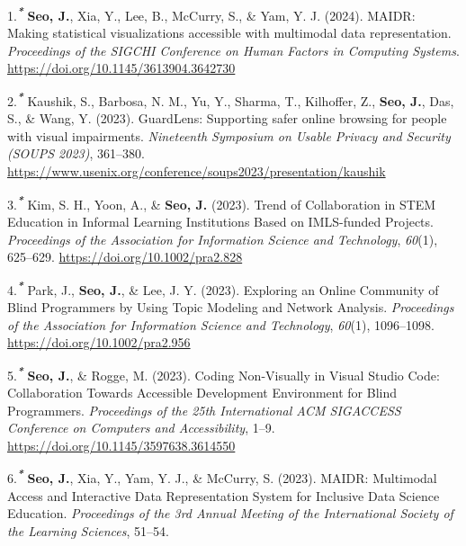 \documentclass[11pt,a4paper,]{awesome-cv}
\newlength{\cslhangindent}
\newenvironment{CSLReferences}[2] %
 {\begin{list}{}{%
  \setlength{\itemindent}{0pt}
  \setlength{\leftmargin}{0pt}
  \setlength{\parsep}{0pt}
  \ifodd #1
   \setlength{\leftmargin}{\cslhangindent}
   \setlength{\itemindent}{-1\cslhangindent}
  \fi
  \setlength{\itemsep}{#2\baselineskip}}}
 {\end{list}}
\begin{document}
\label{refs-1352c89c0d7745c29a221d6dc881aa0d}
\begin{CSLReferences}{1}{0}
1.\textsuperscript{\textbf{\emph{*}}} \textbf{Seo, J.}, Xia, Y., Lee,
B., McCurry, S., \& Yam, Y. J. (2024). MAIDR: Making statistical
visualizations accessible with multimodal data representation.
\emph{Proceedings of the SIGCHI Conference on Human Factors in Computing
Systems}. \url{https://doi.org/10.1145/3613904.3642730}

2.\textsuperscript{\textbf{\emph{*}}} Kaushik, S., Barbosa, N. M., Yu,
Y., Sharma, T., Kilhoffer, Z., \textbf{Seo, J.}, Das, S., \& Wang, Y.
(2023). GuardLens: Supporting safer online browsing for people with
visual impairments. \emph{Nineteenth Symposium on Usable Privacy and
Security (SOUPS 2023)}, 361--380.
\url{https://www.usenix.org/conference/soups2023/presentation/kaushik}

3.\textsuperscript{\textbf{\emph{*}}} Kim, S. H., Yoon, A., \&
\textbf{Seo, J.} (2023). Trend of Collaboration in STEM Education in
Informal Learning Institutions Based on IMLS-funded Projects.
\emph{Proceedings of the Association for Information Science and
Technology}, \emph{60}(1), 625--629.
\url{https://doi.org/10.1002/pra2.828}

4.\textsuperscript{\textbf{\emph{*}}} Park, J., \textbf{Seo, J.}, \&
Lee, J. Y. (2023). Exploring an Online Community of Blind Programmers by
Using Topic Modeling and Network Analysis. \emph{Proceedings of the
Association for Information Science and Technology}, \emph{60}(1),
1096--1098. \url{https://doi.org/10.1002/pra2.956}

5.\textsuperscript{\textbf{\emph{*}}} \textbf{Seo, J.}, \& Rogge, M.
(2023). Coding Non-Visually in Visual Studio Code: Collaboration Towards
Accessible Development Environment for Blind Programmers.
\emph{Proceedings of the 25th International ACM SIGACCESS Conference on
Computers and Accessibility}, 1--9.
\url{https://doi.org/10.1145/3597638.3614550}

6.\textsuperscript{\textbf{\emph{*}}} \textbf{Seo, J.}, Xia, Y., Yam, Y.
J., \& McCurry, S. (2023). MAIDR: Multimodal Access and Interactive Data
Representation System for Inclusive Data Science Education.
\emph{Proceedings of the 3rd Annual Meeting of the International Society
of the Learning Sciences}, 51--54.


\end{CSLReferences}
\end{document}
